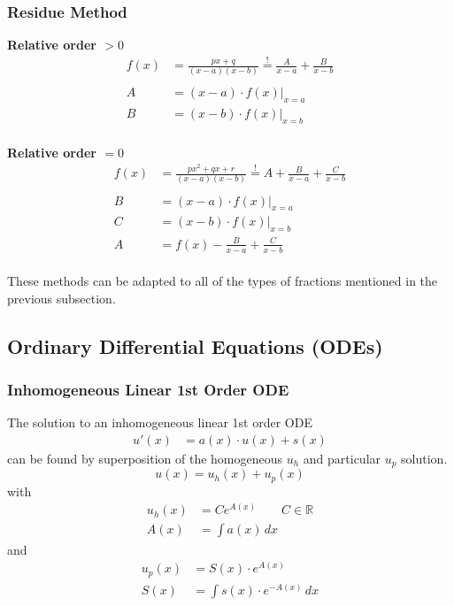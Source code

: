 \subsubsection{Residue Method}
\textbf{Relative order $>0$}
\begin{align*}
    f(x) & =\frac{px+q}{(x-a)(x-b)} \overset{!}{=} \frac{A}{x-a}+\frac{B}{x-b} \\\\
    A    & =(x-a)\cdot f(x)\Big|_{x=a}                                         \\
    B    & =(x-b)\cdot f(x)\Big|_{x=b}
\end{align*}\\
\textbf{Relative order $=0$}
\begin{align*}
    f(x) & =\frac{px^2+qx+r}{(x-a)(x-b)} \overset{!}{=} A+\frac{B}{x-a}+\frac{C}{x-b} \\\\
    B    & =(x-a)\cdot f(x)\Big|_{x=a}                                                \\
    C    & =(x-b)\cdot f(x)\Big|_{x=b}                                                \\
    A    & = f(x)-\frac{B}{x-a}+\frac{C}{x-b}
\end{align*}\\
These methods can be adapted to all of the types of fractions mentioned in the previous subsection.

\subsection{Ordinary Differential Equations (ODEs)}
\subsubsection{Inhomogeneous Linear 1st Order ODE}
The solution to an inhomogeneous linear 1st order ODE
\begin{align*}
    u'(x) & =a(x) \cdot u(x) + s(x)
\end{align*}
can be found by superposition of the homogeneous $u_h$ and particular $u_p$ solution.
\begin{equation*}
    u(x) = u_h(x) + u_p(x)
\end{equation*}
with
\begin{align*}
    u_h(x) & = Ce^{A(x)} \qquad C \in \mathbb{R} \\
    A(x)   & = \int a(x) \,dx
\end{align*}
and
\begin{align*}
    u_p(x) & = S(x) \cdot e^{A(x)}           \\
    S(x)   & = \int s(x)\cdot e^{-A(x)} \,dx
\end{align*}

